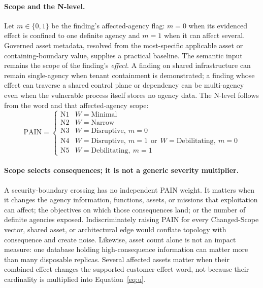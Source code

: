 \documentclass[11pt]{article}
\begin{document}
\paragraph{Scope and the N-level.}
Let $m \in \{0,1\}$ be the finding's affected-agency flag: $m=0$ when its
evidenced effect is confined to one definite agency and $m=1$ when it can affect
several. Governed asset metadata, resolved from the most-specific applicable
asset or containing-boundary value, supplies a practical baseline. The semantic
input remains the scope of the finding's \emph{effect}. A finding on shared
infrastructure can remain single-agency when tenant containment is demonstrated;
a finding whose effect can traverse a shared control plane or dependency can be
multi-agency even when the vulnerable process itself stores no agency data. The
N-level follows from the word and that affected-agency scope:
\begin{equation}
\text{PAIN} =
\begin{cases}
\text{N1} & W=\text{Minimal} \\
\text{N2} & W=\text{Narrow} \\
\text{N3} & W=\text{Disruptive},\ m=0 \\
\text{N4} & W=\text{Disruptive},\ m=1 \ \ \text{or}\ \ W=\text{Debilitating},\ m=0 \\
\text{N5} & W=\text{Debilitating},\ m=1
\end{cases}
\label{eq:pain}
\end{equation}

\paragraph{Scope selects consequences; it is not a generic severity multiplier.}
A security-boundary crossing has no independent PAIN weight. It matters when it
changes the agency information, functions, assets, or missions that exploitation
can affect; the objectives on which those consequences land; or the number of
definite agencies exposed. Indiscriminately raising PAIN for every Changed-Scope
vector, shared asset, or architectural edge would conflate topology with
consequence and create noise. Likewise, asset count alone is not an impact
measure: one database holding high-consequence information can matter more than
many disposable replicas. Several affected assets matter when their combined
effect changes the supported customer-effect word, not because their cardinality
is multiplied into Equation~\eqref{eq:u}.
\end{document}
